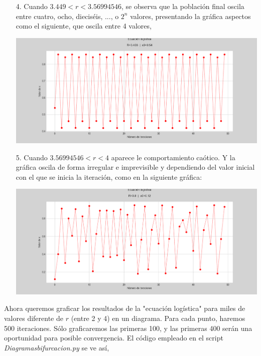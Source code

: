 \documentclass[10pt,a4paper]{article}
\begin{document}
\begin{itemize}
\item[4.] Cuando $3.449 < r < 3.56994546$, se observa que la población final oscila entre cuatro, ocho, dieciséis, ..., o $2^n$ valores, presentando la gráfica aspectos como el siguiente, que oscila entre 4 valores,

\includegraphics[scale=0.5]{Graf_4.png} 

\item[5.] Cuando $3.56994546 < r < 4$ aparece le comportamiento caótico. Y la gráfica oscila de forma irregular e imprevisible y dependiendo del valor inicial con el que se inicia la iteración, como en la siguiente gráfica:

\includegraphics[scale=0.5]{Graf_5.png} 

\end{itemize}

Ahora queremos graficar los resultados de la "ecuación logística" para miles de valores diferente de $r$ (entre 2 y 4) en un diagrama. Para cada punto, haremos 500 iteraciones. Sólo graficaremos las primeras 100, y las primeras 400 serán una oportunidad para posible convergencia. El código empleado en el script \textit{Diagramasbifurcacion.py} se ve así,
\end{document}
